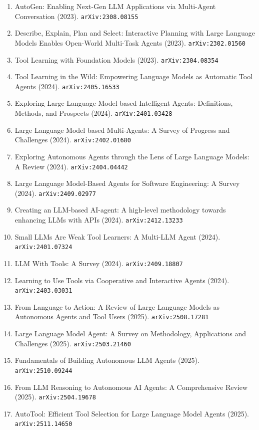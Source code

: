 \documentclass[11pt]{article}
\begin{document}
\begin{enumerate}
  \item AutoGen: Enabling Next-Gen LLM Applications via Multi-Agent Conversation (2023). \texttt{arXiv:2308.08155}
  \item Describe, Explain, Plan and Select: Interactive Planning with Large
  Language Models Enables Open-World Multi-Task Agents (2023). \texttt{arXiv:2302.01560}
  \item Tool Learning with Foundation Models (2023). \texttt{arXiv:2304.08354}
  \item Tool Learning in the Wild: Empowering Language Models as Automatic Tool
  Agents (2024). \texttt{arXiv:2405.16533}
  \item Exploring Large Language Model based Intelligent Agents: Definitions,
  Methods, and Prospects (2024). \texttt{arXiv:2401.03428}
  \item Large Language Model based Multi-Agents: A Survey of Progress and
  Challenges (2024). \texttt{arXiv:2402.01680}
  \item Exploring Autonomous Agents through the Lens of Large Language Models: A
  Review (2024). \texttt{arXiv:2404.04442}
  \item Large Language Model-Based Agents for Software Engineering: A Survey (2024). \texttt{arXiv:2409.02977}
  \item Creating an LLM-based AI-agent: A high-level methodology towards
  enhancing LLMs with APIs (2024). \texttt{arXiv:2412.13233}
  \item Small LLMs Are Weak Tool Learners: A Multi-LLM Agent (2024). \texttt{arXiv:2401.07324}
  \item LLM With Tools: A Survey (2024). \texttt{arXiv:2409.18807}
  \item Learning to Use Tools via Cooperative and Interactive Agents (2024). \texttt{arXiv:2403.03031}
  \item From Language to Action: A Review of Large Language Models as Autonomous Agents and Tool Users (2025). \texttt{arXiv:2508.17281}
  \item Large Language Model Agent: A Survey on Methodology, Applications and
  Challenges (2025). \texttt{arXiv:2503.21460}
  \item Fundamentals of Building Autonomous LLM Agents (2025). \texttt{arXiv:2510.09244}
  \item From LLM Reasoning to Autonomous AI Agents: A Comprehensive Review (2025). \texttt{arXiv:2504.19678}
  \item AutoTool: Efficient Tool Selection for Large Language Model Agents (2025). \texttt{arXiv:2511.14650}

\end{enumerate}
\end{document}
